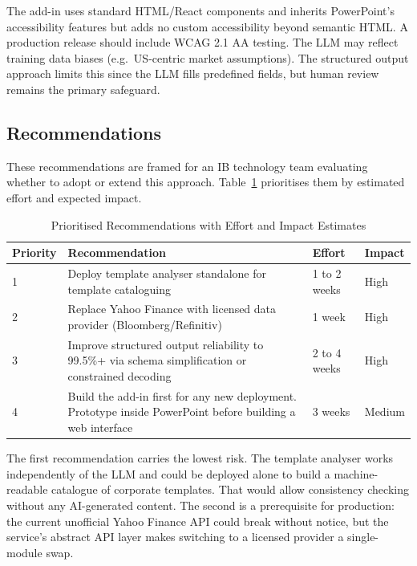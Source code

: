 The add-in uses standard HTML/React components and inherits PowerPoint's accessibility features but adds no custom accessibility beyond semantic HTML. A production release should include WCAG 2.1 AA testing. The LLM may reflect training data biases (e.g.\ US-centric market assumptions). The structured output approach limits this since the LLM fills predefined fields, but human review remains the primary safeguard.

\subsection{Recommendations}

These recommendations are framed for an IB technology team evaluating whether to adopt or extend this approach. Table~\ref{tab:recommendations} prioritises them by estimated effort and expected impact.

\begin{table}[H]
\centering
\begin{tabular}{|l|p{5cm}|l|l|}
\hline
\rowcolor{gray!20} \textbf{Priority} & \textbf{Recommendation} & \textbf{Effort} & \textbf{Impact} \\
\hline
1 & Deploy template analyser standalone for template cataloguing & 1 to 2 weeks & High \\
\hline
2 & Replace Yahoo Finance with licensed data provider (Bloomberg/Refinitiv) & 1 week & High \\
\hline
3 & Improve structured output reliability to 99.5\%+ via schema simplification or constrained decoding & 2 to 4 weeks & High \\
\hline
4 & Build the add-in first for any new deployment. Prototype inside PowerPoint before building a web interface & 3 weeks & Medium \\
\hline
\end{tabular}
\caption{Prioritised Recommendations with Effort and Impact Estimates}
\label{tab:recommendations}
\end{table}

The first recommendation carries the lowest risk. The template analyser works independently of the LLM and could be deployed alone to build a machine-readable catalogue of corporate templates. That would allow consistency checking without any AI-generated content. The second is a prerequisite for production: the current unofficial Yahoo Finance API could break without notice, but the service's abstract API layer makes switching to a licensed provider a single-module swap.

